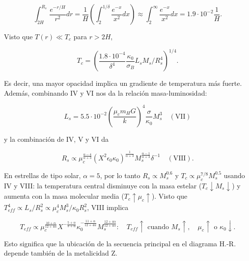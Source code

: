 \documentclass[11pt,letterpaper]{article}
\begin{document}
\begin{itemize}
    \begin{equation}
        \int_{2H}^{R_s} \frac{e^{-r/H}}{r^2} dr = \frac{1}{H} \left( \int_2^{1/\delta} \frac{e^{-x}}{x^2} dx \right) \approx \int_2^{\infty} \frac{e^{-x}}{x^2} dx = 1.9 \cdot 10^{-2} \frac{1}{H}.
    \end{equation}

    Visto que \(T(r) \ll T_c\) para \(r > 2H\), 

    \begin{equation}
        T_c = \left( \frac{1.8 \cdot 10^{-4}}{\delta^4} \frac{\kappa_0}{\sigma_B} L_s M_s / R_s^4 \right)^{1/4}.
    \end{equation}

    Es decir, una mayor opacidad implica un gradiente de temperatura más fuerte. Además, combinando IV y VI nos da la relación masa-luminosidad:

    \begin{equation}
        L_s = 5.5 \cdot 10^{-2} \left( \frac{\mu_c m_H G}{k} \right)^4 \frac{\sigma}{\kappa_0} M_s^3 \quad (\text{VII})
    \end{equation}

    y la combinación de IV, V y VI da

    \begin{equation}
        R_s \propto \mu_c^{\frac{\alpha-4}{\alpha+3}} \left( X^2 \epsilon_0 \kappa_0 \right)^{\frac{1}{\alpha+3}} M_s^{\frac{\alpha-1}{\alpha+3}} \delta^{-1} \quad (\text{VIII}).
    \end{equation}

    En estrellas de tipo solar, \(\alpha=5\), por lo tanto \(R_s \propto M_s^{0.6}\) y \(T_c \propto \mu_c^{7/8} M_s^{0.5}\) usando IV y VIII: la temperatura central disminuye con la masa estelar (\(T_c \downarrow M_s \downarrow\)) y aumenta con la masa molecular media (\(T_c \uparrow \mu_c \uparrow\)). Visto que \(T_{eff}^4 \propto L_s/R_s^2 \propto \mu_c^4 M_s^3 / \kappa_0 R_s^2\), VIII implica 

    \begin{equation}
        T_{eff} \propto \mu_c^{\frac{10+\alpha}{12+4\alpha}} X^{-\frac{5+\alpha}{3+\alpha}} \kappa_0^{-\frac{11+\alpha}{12+4\alpha}} M_s^{\frac{12+4\alpha}{12+4\alpha}} : \quad T_{eff} \uparrow \text{ cuando } M_s \uparrow, \quad \mu_c \uparrow \text{ o } \kappa_0 \downarrow.
    \end{equation}

    Esto significa que la ubicación de la secuencia principal en el diagrama H.-R. depende también de la metalicidad Z.
\end{itemize}
\end{document}
